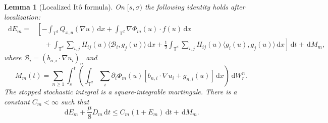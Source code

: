 \documentclass[11pt]{amsart}
\newtheorem{lemma}[theorem]{Lemma}
\theoremstyle{definition}
\newcommand{\T}{\mathbb T}
\newcommand{\dd}{\,\mathrm d}
\numberwithin{equation}{section}
\begin{document}
\begin{lemma}[Localized It\^o formula]\label{lem:ito}
On $[s,\sigma)$ the following identity holds after localization:
\begin{equation}\label{eq:ito}
\begin{split}
\dd E_m={}&\left[-\int_{\T^d} Q_{x,u}(\nabla u)\dd x
 +\int_{\T^d}\nabla\Phi_m(u)\cdot f(u)\dd x\right.\\
&\left.\quad+\int_{\T^d}\sum_{i,j}H_{ij}(u)
 \langle\mathcal B_i,g_j(u)\rangle\dd x
 +\frac12\int_{\T^d}\sum_{i,j}H_{ij}(u)
 \langle g_i(u),g_j(u)\rangle\dd x\right]\dd t+\dd M_m,
\end{split}
\end{equation}
where $\mathcal B_i=(b_{n,i}\cdot\nabla u_i)_n$ and
\begin{equation}\label{eq:martingale}
M_m(t)=\sum_{n\geq1}\int_s^t
 \left(\int_{\T^d}\sum_i\partial_i\Phi_m(u)
 [b_{n,i}\cdot\nabla u_i+g_{n,i}(u)]\dd x\right)\dd W^n_r.
\end{equation}
The stopped stochastic integral is a square-integrable martingale.
There is a constant $C_m<\infty$ such that
\begin{equation}\label{eq:energy-inequality}
\dd E_m+\frac\mu8D_m\dd t
 \leq C_m(1+E_m)\dd t+\dd M_m.
\end{equation}
\end{lemma}
\end{document}
